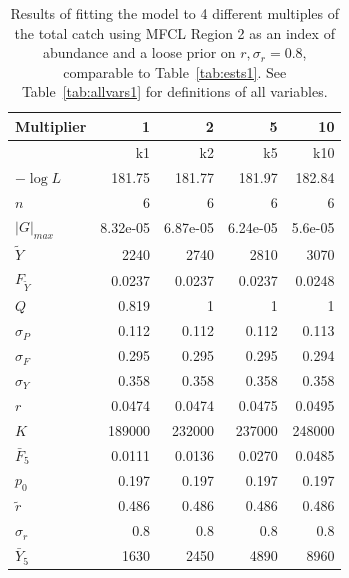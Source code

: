 \documentclass[12pt,letterpaper]{article}
\newcommand\MSY{\widetilde{Y}}
\newcommand\Fmsy{F_{\MSY}}
\begin{document}
\begin{table}
{\small
\caption{Results of fitting the model to 4 different multiples of the
total catch using MFCL Region 2 as an index of abundance and a loose
prior on $r, \sigma_r = 0.8$, comparable to Table~\ref{tab:ests1}. 
See Table~\ref{tab:allvars1} for definitions of all variables.
\label{tab:k2}}
\begin{center}
\begin{tabular}{|l|rrrr|}
\hline
Multiplier & 1 & 2 & 5 & 10\\
\hline
&k1 & k2 & k5 & k10\\
$-\log L$ & 181.75 & 181.77 & 181.97 & 182.84\\
$n$ & 6 & 6 & 6 & 6\\
$|G|_{max}$ & 8.32e-05 & 6.87e-05 & 6.24e-05 & 5.6e-05\\
\hline
$\MSY$ & 2240 & 2740 & 2810 & 3070\\
$\Fmsy$ & 0.0237 & 0.0237 & 0.0237 & 0.0248\\
$Q$ & 0.819 & 1 & 1 & 1\\
$\sigma_P$ & 0.112 & 0.112 & 0.112 & 0.113\\
$\sigma_F$ & 0.295 & 0.295 & 0.295 & 0.294\\
$\sigma_Y$ & 0.358 & 0.358 & 0.358 & 0.358\\
\hline
$r$ & 0.0474 & 0.0474 & 0.0475 & 0.0495\\
$K$ & 189000 & 232000 & 237000 & 248000\\
$\bar{F}_5$ & 0.0111 & 0.0136 & 0.0270 & 0.0485\\
\hline
$p_0$ & 0.197 & 0.197 & 0.197 & 0.197\\
$\tilde{r}$ & 0.486 & 0.486 & 0.486 & 0.486\\
$\sigma_r$ & 0.8 & 0.8 & 0.8 & 0.8\\
$\bar{Y}_5$ & 1630 & 2450 & 4890 & 8960\\
\hline
\end{tabular}
\end{center}
}
\end{table}
\end{document}
